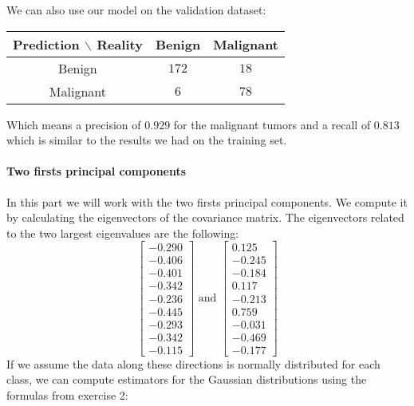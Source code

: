 \documentclass[a4paper, 10pt]{article}
\begin{document}
We can also use our model on the validation dataset:
\begin{center}
    \begin{tabular}{ |c|c|c| }
        \hline
        Prediction $\backslash$ Reality & Benign & Malignant \\
        \hline
        Benign & $172$ & $18$ \\
        \hline
        Malignant & $6$ & $78$ \\ 
        \hline
    \end{tabular}
\end{center}
Which means a precision of $0.929$ for the malignant tumors and a recall of $0.813$ which is similar to
the results we had on the training set.

\paragraph{Two firsts principal components}
In this part we will work with the two firsts principal components. We compute it by calculating the
eigenvectors of the covariance matrix. The eigenvectors related to the two largest eigenvalues are the following:
$$
\begin{bmatrix}
    -0.290\\
    -0.406\\
    -0.401\\
    -0.342\\
    -0.236\\
    -0.445\\
    -0.293\\
    -0.342\\
    -0.115
\end{bmatrix}\text{ and } \begin{bmatrix}
    0.125\\
   -0.245\\
   -0.184\\
    0.117\\
   -0.213\\
    0.759\\
   -0.031\\
   -0.469\\
   -0.177
\end{bmatrix}
$$
If we assume the data along these directions is normally distributed for each class, we can compute
estimators for the Gaussian distributions using the formulas from exercise 2:
\end{document}
